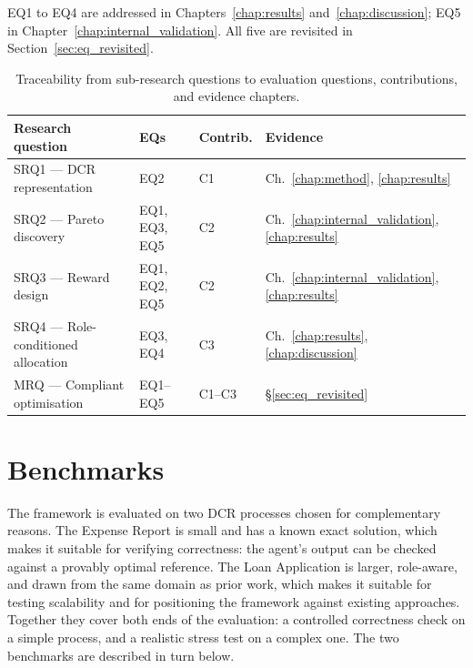 EQ1 to EQ4 are addressed in Chapters~\ref{chap:results}
and~\ref{chap:discussion}; EQ5 in
Chapter~\ref{chap:internal_validation}. All five are revisited in
Section~\ref{sec:eq_revisited}.

\begin{table}[H]
\centering
\renewcommand{\arraystretch}{1.5}
\setlength{\tabcolsep}{10pt}
\caption{Traceability from sub-research questions to evaluation
         questions, contributions, and evidence chapters.}
\label{tab:rq_traceability}
\begin{tabular}{llll}
\toprule
\textbf{Research question} & \textbf{EQs} &
\textbf{Contrib.} & \textbf{Evidence} \\
\midrule
SRQ1 --- \ac{DCR} representation & EQ2 & C1 &
Ch.~\ref{chap:method}, \ref{chap:results} \\
SRQ2 --- Pareto discovery & EQ1, EQ3, EQ5 & C2 &
Ch.~\ref{chap:internal_validation}, \ref{chap:results} \\
SRQ3 --- Reward design & EQ1, EQ2, EQ5 & C2 &
Ch.~\ref{chap:internal_validation}, \ref{chap:results} \\
SRQ4 --- Role-conditioned allocation & EQ3, EQ4 & C3 &
Ch.~\ref{chap:results}, \ref{chap:discussion} \\
MRQ --- Compliant optimisation & EQ1--EQ5 & C1--C3 &
\S\ref{sec:eq_revisited} \\
\bottomrule
\end{tabular}
\end{table}


\newpage
\section{Benchmarks}
\label{sec:benchmarks}
The framework is evaluated on two \ac{DCR} processes chosen for
complementary reasons. The Expense Report is small and has a known
exact solution, which makes it suitable for verifying correctness: the
agent's output can be checked against a provably optimal reference. The
Loan Application is larger, role-aware, and drawn from the same domain
as prior work, which makes it suitable for testing scalability and for
positioning the framework against existing approaches. Together they
cover both ends of the evaluation: a controlled correctness check on a
simple process, and a realistic stress test on a complex one. The two
benchmarks are described in turn below.

